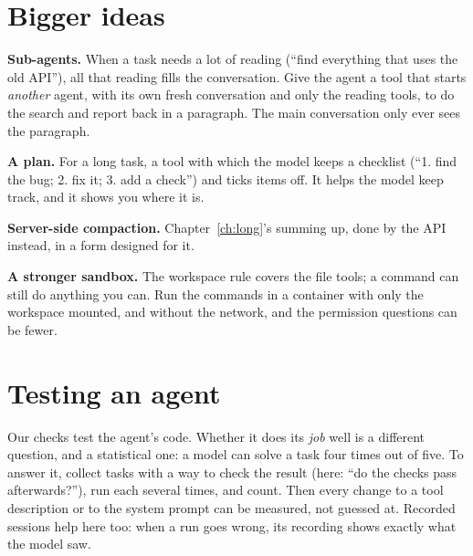 \section{Bigger ideas}

\textbf{Sub-agents.} When a task needs a lot of reading (``find everything
that uses the old API''), all that reading fills the conversation. Give
the agent a tool that starts \emph{another} agent, with its own fresh
conversation and only the reading tools, to do the search and report back
in a paragraph. The main conversation only ever sees the paragraph.

\textbf{A plan.} For a long task, a tool with which the model keeps a
checklist (``1. find the bug; 2. fix it; 3. add a check'') and ticks items
off. It helps the model keep track, and it shows you where it is.

\textbf{Server-side compaction.} Chapter~\ref{ch:long}'s summing up, done by
the API instead, in a form designed for it.

\textbf{A stronger sandbox.} The workspace rule covers the file tools; a
command can still do anything you can. Run the commands in a container
with only the workspace mounted, and without the network, and the
permission questions can be fewer.

\section{Testing an agent}

Our checks test the agent's code. Whether it does its \emph{job} well is a
different question, and a statistical one: a model can solve a task four
times out of five. To answer it, collect tasks with a way to check the
result (here: ``do the checks pass afterwards?''), run each several
times, and count. Then every change to a tool description or to the system
prompt can be measured, not guessed at. Recorded sessions help here too:
when a run goes wrong, its recording shows exactly what the model saw.
